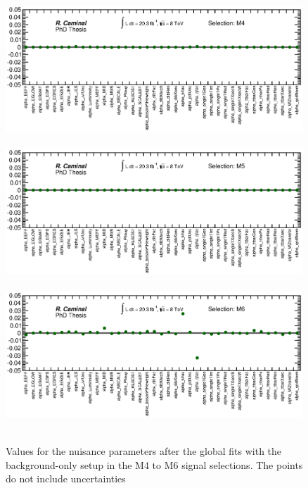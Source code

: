 \begin{figure}[!ht]
  \begin{center}
    \mbox{
      \includegraphics[width=0.995\textwidth]{MonojetAnalysis/Figures/NuisanceParamsZoomPlot_Stop_M4.eps}
    }
    \mbox{
      \includegraphics[width=0.995\textwidth]{MonojetAnalysis/Figures/NuisanceParamsZoomPlot_Stop_M5.eps}
    }
    \mbox{
      \includegraphics[width=0.995\textwidth]{MonojetAnalysis/Figures/NuisanceParamsZoomPlot_Stop_M6.eps}
    }
  \end{center}
  \caption[Nuisance parameter values after the global fits with the background-only setup in the M4 to M6 signal selections.]{Values for the nuisance parameters after the global fits with the background-only setup in the M4 to M6 signal selections. The points do not include uncertainties}
  \label{fig:corrMatrix_M4M5M6}
\end{figure}
